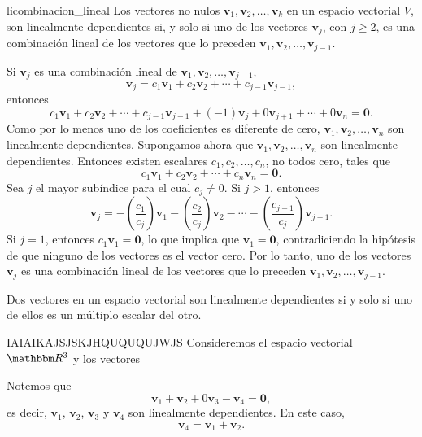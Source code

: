 \begin{theorem}{}{licombinacion_lineal}
    Los vectores no nulos $\mathbf{v}_1, \mathbf{v}_2, \dots, \mathbf{v}_k$ en un espacio vectorial $V$, son linealmente dependientes si, y solo si uno de los vectores $\mathbf{v}_j$, con $j \geq 2$, es una combinación lineal de los vectores que lo preceden $\mathbf{v}_1, \mathbf{v}_2, \dots, \mathbf{v}_{j-1}$.

    \tcblower
    \demostracion Si $\mathbf{v}_j$ es una combinación lineal de $\mathbf{v}_1, \mathbf{v}_2, \dots, \mathbf{v}_{j-1}$,
    $$\mathbf{v}_j = c_1 \mathbf{v}_1 + c_2 \mathbf{v}_2 + \cdots + c_{j-1} \mathbf{v}_{j-1},$$
    entonces
    $$c_1 \mathbf{v}_1 + c_2 \mathbf{v}_2 + \cdots + c_{j-1} \mathbf{v}_{j-1} + (-1) \mathbf{v}_j + 0 \mathbf{v}_{j+1} + \cdots + 0 \mathbf{v}_n = \mathbf{0}.$$
    Como por lo menos uno de los coeficientes es diferente de cero, $\mathbf{v}_1, \mathbf{v}_2, \dots, \mathbf{v}_n$ son linealmente dependientes. Supongamos ahora que $\mathbf{v}_1, \mathbf{v}_2, \dots, \mathbf{v}_n$ son linealmente dependientes. Entonces existen escalares $c_1, c_2, \dots, c_n$, no todos cero, tales que
    $$c_1 \mathbf{v}_1 + c_2 \mathbf{v}_2 + \cdots + c_n \mathbf{v}_n = \mathbf{0}.$$
    Sea $j$ el mayor subíndice para el cual $c_j \neq 0$. Si $j > 1$, entonces
    $$\mathbf{v}_j = - \left( \frac{c_1}{c_j} \right) \mathbf{v}_1 - \left( \frac{c_2}{c_j} \right) \mathbf{v}_2 - \cdots - \left( \frac{c_{j-1}}{c_j} \right) \mathbf{v}_{j-1}.$$
    Si $j = 1$, entonces $c_1 \mathbf{v}_1 = \mathbf{0}$, lo que implica que $\mathbf{v}_1 = \mathbf{0}$, contradiciendo la hipótesis de que ninguno de los vectores es el vector cero. Por lo tanto, uno de los vectores $\mathbf{v}_j$ es una combinación lineal de los vectores que lo preceden $\mathbf{v}_1, \mathbf{v}_2, \dots, \mathbf{v}_{j-1}$.
\end{theorem}

\begin{corollary}{}{}
    Dos vectores en un espacio vectorial son linealmente dependientes si y solo si uno de ellos es un múltiplo escalar del otro.
\end{corollary}

\begin{examplebox}{}{IAIAIKAJSJSKJHQUQUQUJWJS}
    Consideremos el espacio vectorial $\RR[3]$ y los vectores
    \begin{matrizn}
    \end{matrizn}
    Notemos que
    $$\mathbf{v}_1 + \mathbf{v}_2 + 0\mathbf{v}_3 - \mathbf{v}_4 = \mathbf{0},$$
    es decir, $\mathbf{v}_1$, $\mathbf{v}_2$, $\mathbf{v}_3$ y $\mathbf{v}_4$ son linealmente dependientes. En este caso,
    $$\mathbf{v}_4 = \mathbf{v}_1 + \mathbf{v}_2.$$
\end{examplebox}

